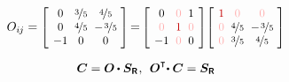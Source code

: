 \begin{otherlanguage}{russian}
\begin{tcolorbox}
\begin{equation*}
O_{i\hspace{-0.1ex}j} =
\scalebox{0.92}[0.92]{$\left[\hspace{-0.2ex}\begin{array}{c@{\hspace{.6em}}c@{\hspace{.6em}}c}
0 & \nicefrac{3}{5} & \nicefrac{4}{5} \\
0 & \nicefrac{4}{5} & - \hspace{.2ex} \nicefrac{3}{5} \\
-1 & 0 & 0
\end{array}\hspace{-0.4ex}\right]$}
\hspace{-0.25ex} = \hspace{-0.25ex}
\scalebox{0.92}[0.92]{$\left[\hspace{-0.2ex}\begin{array}{c@{\hspace{.6em}}c@{\hspace{.6em}}c}
0 & \mathcolor{red!33!white}{0} & 1 \\
\mathcolor{red!33!white}{0} & \mathcolor{red!77!black}{1} & \mathcolor{red!33!white}{0} \\
-1 & \mathcolor{red!33!white}{0} & 0
\end{array}\hspace{-0.2ex}\right]$}
\scalebox{0.92}[0.92]{$\left[\hspace{-0.2ex}\begin{array}{c@{\hspace{.6em}}c@{\hspace{.6em}}c}
\mathcolor{red!77!black}{1} & \mathcolor{red!33!white}{0} & \mathcolor{red!33!white}{0} \\
\mathcolor{red!33!white}{0} & \nicefrac{4}{5} & - \hspace{.2ex} \nicefrac{3}{5} \\
\mathcolor{red!33!white}{0} & \nicefrac{3}{5} & \nicefrac{4}{5}
\end{array}\hspace{-0.4ex}\right]$}
\end{equation*}

\begin{equation*}\begin{array}{c}
\bm{C} = \rotationtensor \hspace{-0.1ex} \dotp \bm{S_{\smash{\mathsf{R}}}}
\hspace{.1ex} , \:\:
\rotationtensor^{\T}\hspace{-0.5ex} \dotp \bm{C} = \bm{S_{\smash{\mathsf{R}}}}
\end{array}\end{equation*}


\end{tcolorbox}
\end{otherlanguage}
